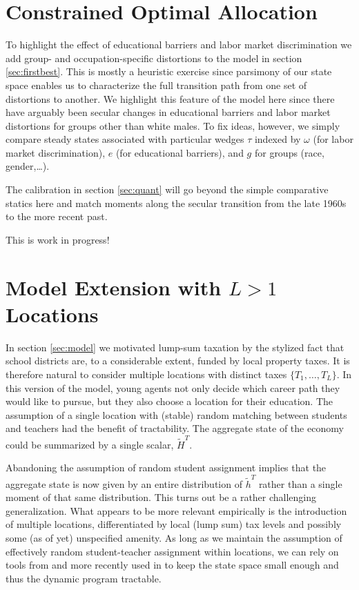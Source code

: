 \documentclass[onehalfspacing,11pt]{article}
\begin{document}
\section{Constrained Optimal Allocation}
To highlight the effect of educational barriers and labor market discrimination we add group- and occupation-specific distortions to the model in section \ref{sec:firstbest}. This is mostly a heuristic exercise since parsimony of our state space enables us to characterize the full transition path from one set of distortions to another. We highlight this feature of the model here since there have arguably been secular changes in educational barriers and labor market distortions for groups other than white males. To fix ideas, however, we simply compare steady states associated with particular wedges $\tau$ indexed by $\omega$ (for labor market discrimination), $e$ (for educational barriers), and $g$ for groups (race, gender,\ldots).

The calibration in section \ref{sec:quant} will go beyond the simple comparative statics here and match moments along the secular transition from the late 1960s to the more recent past.

{\sc This is work in progress!}
\section{Model Extension with $L > 1$ Locations}
In section \ref{sec:model} we motivated lump-sum taxation by the stylized fact that school districts are, to a considerable extent, funded by local property taxes. It is therefore natural to consider multiple locations with distinct taxes $\{T_1,\ldots,T_L\}$. In this version of the model, young agents not only decide which career path they would like to pursue, but they also choose a location for their education. %
The assumption of a single location with (stable) random matching between students and teachers had the benefit of tractability. The aggregate state of the economy could be summarized by a single scalar, $ \widetilde{H}^{T}$.

Abandoning the assumption of random student assignment implies that the aggregate state is now given by an entire distribution of $\widetilde{h}^{T}$ rather than a single moment of that same distribution. This turns out be a rather challenging generalization. What appears to be more relevant empirically is the introduction of multiple locations, differentiated by local (lump sum) tax levels and possibly some (as of yet) unspecified amenity. As long as we maintain the assumption of effectively random student-teacher assignment within locations, we can rely on tools from \cite{Lucas:2014} and more recently used in \cite{Martellini:2019} to keep the state space small enough and thus the dynamic program tractable.
\end{document}

